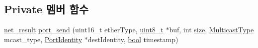 \subsection*{Private 멤버 함수}
\begin{DoxyCompactItemize}
\item 
\hyperlink{avbts__osnet_8hpp_a21b2b4b5e479ef3adfc039ac30c961cd}{net\+\_\+result} \hyperlink{class_ether_port_a608936cc036ef22825732a04d1eed7d8}{port\+\_\+send} (uint16\+\_\+t ether\+Type, \hyperlink{stdint_8h_aba7bc1797add20fe3efdf37ced1182c5}{uint8\+\_\+t} $\ast$buf, int \hyperlink{gst__avb__playbin_8c_a439227feff9d7f55384e8780cfc2eb82}{size}, \hyperlink{avbts__message_8hpp_aee4ca524cb617678ed1bd2db2b56da42}{Multicast\+Type} mcast\+\_\+type, \hyperlink{class_port_identity}{Port\+Identity} $\ast$dest\+Identity, \hyperlink{avb__gptp_8h_af6a258d8f3ee5206d682d799316314b1}{bool} timestamp)
\end{DoxyCompactItemize}
